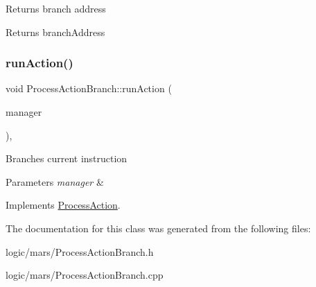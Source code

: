 Returns branch address \begin{DoxyReturn}{Returns}
branch\+Address 
\end{DoxyReturn}
\mbox{\label{classProcessActionBranch_a2aadd61680b350a4b9112ff3757f1944}} 
\subsubsection{\texorpdfstring{run\+Action()}{runAction()}}
{\footnotesize\ttfamily void Process\+Action\+Branch\+::run\+Action (\begin{DoxyParamCaption}\item[{\hyperlink{classProcessManager}{Process\+Manager} \&}]{manager }\end{DoxyParamCaption})\hspace{0.3cm}{\ttfamily [override]}, {\ttfamily [virtual]}}

Branches current instruction 
\begin{DoxyParams}{Parameters}
{\em manager} & \\
\hline
\end{DoxyParams}


Implements \hyperlink{classProcessAction}{Process\+Action}.



The documentation for this class was generated from the following files\+:\begin{DoxyCompactItemize}
\item 
logic/mars/Process\+Action\+Branch.\+h\item 
logic/mars/Process\+Action\+Branch.\+cpp\end{DoxyCompactItemize}

